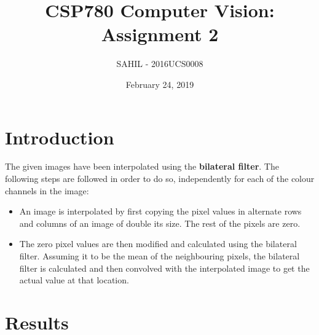 \documentclass{article}
\title{CSP780 Computer Vision: Assignment 2}
\author{SAHIL - 2016UCS0008}
\date{February 24, 2019}
\begin{document}
\maketitle

\section{Introduction}
\large
The given images have been interpolated using the \textbf{bilateral filter}. The following steps are followed in order to do so, independently for each of the colour channels in the image:
\begin{itemize}
    \item An image is interpolated by first copying the pixel values in alternate rows and columns of an image of double its size. The rest of the pixels are zero. 
    \item The zero pixel values are then modified and calculated using the bilateral filter. Assuming it to be the mean of the neighbouring pixels, the bilateral filter is calculated and then convolved with the interpolated image to get the actual value at that location. 
\end{itemize}

\section{Results}
\end{document}
